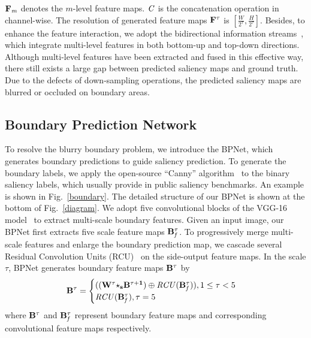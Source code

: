\documentclass[journal]{IEEEtran}
\begin{document}
$\bf{F}_{\it{m}}$ denotes the $m$-level feature maps.
$\it{C}$ is the concatenation operation in channel-wise.
The resolution of generated feature maps $\bf{F^{\tau}}$ is $[\frac{W}{2^{\tau}},\frac{H}{2^{\tau}}]$.
Besides, to enhance the feature interaction, we adopt the bidirectional information streams~\cite{Zhang2017Amulet}, which integrate multi-level features in both bottom-up and top-down directions.
Although multi-level features have been extracted and fused in this effective way, there still exists a large gap between predicted saliency maps and ground truth.
Due to the defects of down-sampling operations, the predicted saliency maps are blurred or occluded on boundary areas.
\vspace{-2mm}
\subsection{Boundary Prediction Network}
\label{Boundary Prediction Network}
To resolve the blurry boundary problem, we introduce the BPNet, which generates boundary predictions to guide saliency prediction.
To generate the boundary labels, we apply the open-source ``Canny” algorithm~\cite{Canny} to the binary saliency labels,  which usually provide in public saliency benchmarks. An example is shown in Fig.~\ref{boundary}.
The detailed structure of our BPNet is shown at the bottom of Fig.~\ref{diagram}.
We adopt five convolutional blocks of the VGG-16 model~\cite{simonyan2014very} to extract multi-scale boundary features.
Given an input image, our BPNet first extracts five scale feature maps $\bf{B}^{\tau}_{\it{f}}$.
To progressively merge multi-scale features and enlarge the boundary prediction map, we cascade several Residual Convolution Units (RCU)~\cite{Lin2017RefineNet} on the side-output feature maps.
In the scale $\tau$, BPNet generates boundary feature maps $\bf{B}^{\tau}$ by
\begin{equation}
\begin{aligned}
\bf{B}^{\tau}=
\begin{cases}
((\bf{W}^{\tau}{\star}_{s}\bf{B}^{{\tau}+1})\oplus \it{RCU}(\bf{B}_{\it{f}}^{\tau})),\rm{1}\le\it{\tau}<\rm{5}\\
\it{RCU}(\bf{B}_{\it{f}}^{\tau}),\it{\tau}=\rm{5}
\end{cases}
\label{boundary feature map}
\end{aligned}
\end{equation}
where $\bf{B}^{\it{\tau}}$ and $\bf{B}_{\it{f}}^{\it{\tau}}$ represent boundary feature maps and corresponding convolutional feature maps respectively.
\end{document}
